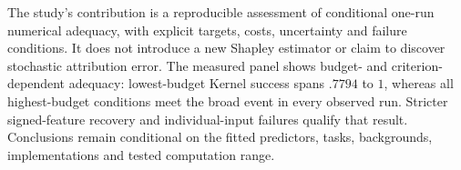 The study's contribution is a reproducible assessment of conditional one-run numerical adequacy, with explicit targets, costs, uncertainty and failure conditions. It does not introduce a new Shapley estimator or claim to discover stochastic attribution error. The measured panel shows budget- and criterion-dependent adequacy: lowest-budget Kernel success spans $.7794$ to $1$, whereas all highest-budget conditions meet the broad event in every observed run. Stricter signed-feature recovery and individual-input failures qualify that result. Conclusions remain conditional on the fitted predictors, tasks, backgrounds, implementations and tested computation range.
